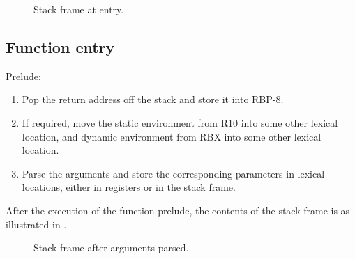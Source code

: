\begin{figure}
\begin{center}
\end{center}
\caption{\label{fig-x86-64-alternative-stack-frame-at-entry}
Stack frame at entry.}
\end{figure}

\subsection{Function entry}

Prelude:

\begin{enumerate}
\item Pop the return address off the stack and store it into RBP-8.
\item If required, move the static environment from R10 into some
  other lexical location, and dynamic environment from RBX into some
  other lexical location.
\item Parse the arguments and store the corresponding parameters in
  lexical locations, either in registers or in the stack frame.
\end{enumerate}

After the execution of the function prelude, the contents of the stack
frame is as illustrated in
.

\begin{figure}
\begin{center}
\end{center}
\caption{\label{fig-x86-64-alternative-stack-frame-after-arguments-parsed}
Stack frame after arguments parsed.}
\end{figure}

